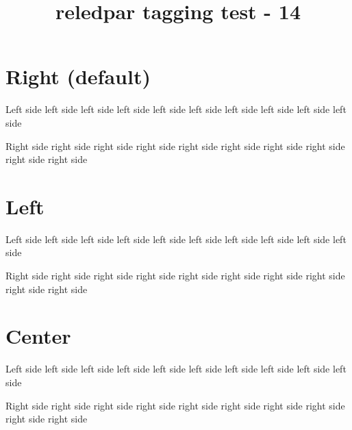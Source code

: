 \documentclass{article}
\title{reledpar tagging test - 14}
\begin{document}
\section{Right (default)}

\begin{pairs}

\begin{Leftside}
\beginnumbering
\pstart
Left side left side left side left side left side left side left side left side left side left side
\pend
\endnumbering
\end{Leftside}

\begin{Rightside}
\beginnumbering
\pstart
Right side right side right side right side right side right side right side right side right side right side
\pend
\endnumbering
\end{Rightside}
\end{pairs}
\Columns

\section{Left}

\begin{pairs}

\begin{Leftside}
\beginnumbering
\pstart
Left side left side left side left side left side left side left side left side left side left side
\pend
\endnumbering
\end{Leftside}

\begin{Rightside}
\beginnumbering
\pstart
Right side right side right side right side right side right side right side right side right side right side
\pend
\endnumbering
\end{Rightside}
\end{pairs}
\Columns

\section{Center}

\begin{pairs}

\begin{Leftside}
\beginnumbering
\pstart
Left side left side left side left side left side left side left side left side left side left side
\pend
\endnumbering
\end{Leftside}

\begin{Rightside}
\beginnumbering
\pstart
Right side right side right side right side right side right side right side right side right side right side
\pend
\endnumbering
\end{Rightside}
\end{pairs}
\Columns
\end{document}
